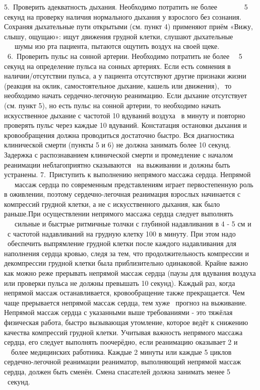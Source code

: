 \documentclass[a4paper, 12pt]{article}
\theoremstyle{definition}
\begin{document}
        5. Проверить адекватность дыхания. Необходимо потратить не более        5 секунд на проверку наличия нормального дыхания у взрослого без сознания. Сохраняя дыхательные пути открытыми (см. пункт 4) применяют приём «Вижу, слышу, ощущаю»: ищут движения грудной клетки, слушают дыхательные    шумы изо рта пациента, пытаются ощутить воздух на своей щеке.
         6. Проверить пульс на сонной артерии. Необходимо потратить не более   5 секунд на определение пульса на сонных артериях. Если есть сомнения в наличии/отсутствии пульса, а у пациента отсутствуют другие признаки жизни (реакция на оклик, самостоятельное дыхание, кашель или движения),  то необходимо начать сердечно-легочную реанимацию.
        Если дыхание отсутствует (см. пункт 5), но есть пульс на сонной артерии, то необходимо начать искусственное дыхание с частотой 10 вдуваний воздуха  в минуту и повторно проверять пульс через каждые 10 вдуваний.
        Констатация остановки дыхания и кровообращения должна проводиться достаточно быстро. Вся диагностика клинической смерти (пункты 5 и 6) не должна занимать более 10 секунд. Задержка с распознаванием клинической смерти и промедление с началом реанимации неблагоприятно сказываются  на выживании и должны быть устранены.
        7. Приступить к выполнению непрямого массажа сердца. Непрямой    массаж сердца по современным представлениям играет первостепенную роль в оживлении, поэтому сердечно-легочная реанимация взрослых начинается с компрессий грудной клетки, а не с искусственного дыхания, как было раньше.При осуществлении непрямого массажа сердца следует выполнять    сильные и быстрые ритмичные толчки с глубиной надавливания в 4 - 5 см и  с частотой надавливаний на грудную клетку 100 в минуту. При этом надо  обеспечить выпрямление грудной клетки после каждого надавливания для наполнения сердца кровью, следя за тем, что продолжительность компрессии и декомпрессии грудной клетки была приблизительно одинаковой.
        Крайне важно как можно реже прерывать непрямой массаж сердца (паузы для вдувания воздуха или проверки пульса не должны превышать 10 секунд). Каждый раз, когда непрямой массаж останавливается, кровообращение также прекращается. Чем чаще прерывается непрямой массаж сердца, тем хуже  прогноз на выживание.
        Непрямой массаж сердца с указанными выше требованиями - это тяжёлая физическая работа, быстро вызывающая утомление, которое ведёт к снижению качества компрессий грудной клетки. Учитывая важность непрямого массажа сердца, его следует выполнять поочерёдно, если реанимацию оказывает 2 и   более медицинских работника. Каждые 2 минуты или каждые 5 циклов сердечно-легочной реанимации реаниматор, выполняющий непрямой массаж сердца, должен быть сменён. Смена спасателей должна занимать менее 5  секунд.
\end{document}
